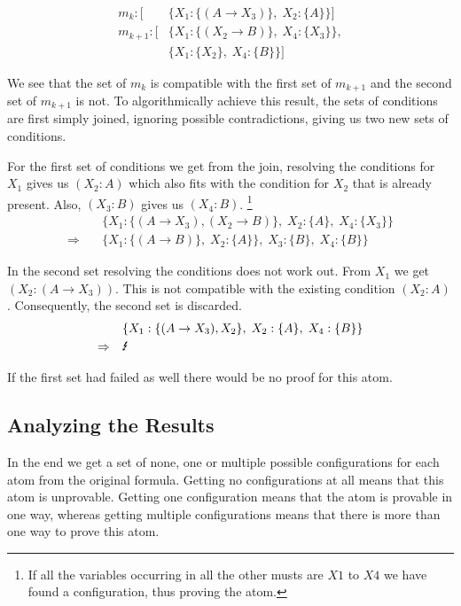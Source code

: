 \begin{align*}
	m_k: [	& \{X_1: \{(A \rightarrow X_3)\},\; X_2: \{A\}\}]\\
	m_{k+1}: [	& \{X_1: \{(X_2 \rightarrow B)\},\; X_4: \{X_3\}\},\\
			& \{X_1: \{X_2\},\; X_4: \{B\}\}]
\end{align*}

We see that the set of $m_k$ is compatible with the first set of $m_{k+1}$ and the second set of $m_{k+1}$ is not. To algorithmically achieve this result, the sets of conditions are first simply joined, ignoring possible contradictions, giving us two new sets of conditions.

For the first set of conditions we get from the join, resolving the conditions for $X_1$ gives us $(X_2:A)$ which also fits with the condition for $X_2$ that is already present. Also, $(X_3: B)$ gives us $(X_4: B)$. \footnote{If all the variables occurring in all the other musts are $X1$ to $X4$ we have found a configuration, thus proving the atom.}
\begin{align*}
	& \{	X_1: \{(A \rightarrow X_3), (X_2 \rightarrow B)\},\;
						X_2: \{A\}, \;
						X_4: \{X_3\}\}\\
					\Rightarrow \quad & \{X_1: \{(A \rightarrow B)\},\; X_2: \{A\}\}, \;X_3: \{B\},\; X_4: \{B\}\}
\end{align*}

In the second set resolving the conditions does not work out. From $X_1$ we get $(X_2: (A \rightarrow X_3))$. This is not compatible with the existing condition $(X_2: A)$. Consequently, the second set is discarded. 
\begin{align*}
	& \{X_1: \{(A \rightarrow X_3), X_2\},\;
						X_2: \{A\}, \;
						X_4: \{B\}\} \\
					\Rightarrow \quad & \text{\Lightning} 
\end{align*}

If the first set had failed as well there would be no proof for this atom.

\subsection{Analyzing the Results}
In the end we get a set of none, one or multiple possible configurations for each atom from the original formula. Getting no configurations at all means that this atom is unprovable. Getting one configuration means that the atom is provable in one way, whereas getting multiple configurations means that there is more than one way to prove this atom.

